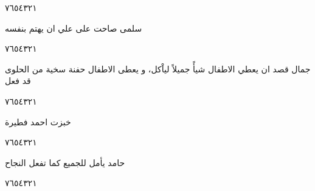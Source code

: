 \documentclass[11pt, a4paper]{article}
\begin{document}
{\begin{center}
        \hfill\textarabic{٧}\hfill\textarabic{٦}\hfill\textarabic{٥}\hfill\textarabic{٤}\hfill\textarabic{٣}\hfill\textarabic{٢}\hfill\textarabic{١}
        \end{center}


\vspace{0.5\baselineskip}\begin{flushright}
\textarabic{سلمى صاحت على علي ان يهتم بنفسه}
\end{flushright}

\begin{center}
        \hfill\textarabic{٧}\hfill\textarabic{٦}\hfill\textarabic{٥}\hfill\textarabic{٤}\hfill\textarabic{٣}\hfill\textarabic{٢}\hfill\textarabic{١}
        \end{center}


\vspace{0.5\baselineskip}\begin{flushright}
\textarabic{جمال قصد ان يعطي الاطفال شيأً جميلاً لياْكل، و يعطى الاطفال حفنة سخية من الحلوى قد فعل}
\end{flushright}

\begin{center}
        \hfill\textarabic{٧}\hfill\textarabic{٦}\hfill\textarabic{٥}\hfill\textarabic{٤}\hfill\textarabic{٣}\hfill\textarabic{٢}\hfill\textarabic{١}
        \end{center}


\vspace{0.5\baselineskip}\begin{flushright}
\textarabic{خبزت احمد فطيرة}
\end{flushright}

\begin{center}
        \hfill\textarabic{٧}\hfill\textarabic{٦}\hfill\textarabic{٥}\hfill\textarabic{٤}\hfill\textarabic{٣}\hfill\textarabic{٢}\hfill\textarabic{١}
        \end{center}


\vspace{0.5\baselineskip}\begin{flushright}
\textarabic{حامد يأمل للجميع كما تفعل النجاح}
\end{flushright}

\begin{center}
        \hfill\textarabic{٧}\hfill\textarabic{٦}\hfill\textarabic{٥}\hfill\textarabic{٤}\hfill\textarabic{٣}\hfill\textarabic{٢}\hfill\textarabic{١}
        \end{center}


}
\end{document}
